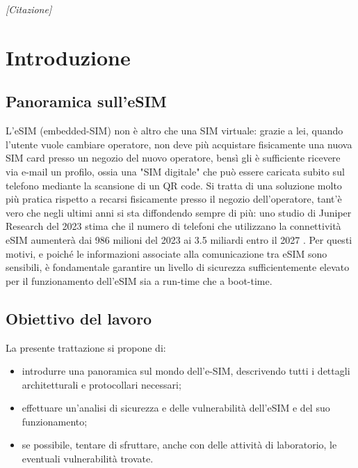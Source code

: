 \documentclass[10pt, oneside]{book}
\begin{document}
\begin{frontespizio}
\end{frontespizio}

\begin{flushright}
\null{}
\textit{[Citazione]}
\null
\end{flushright}

\tableofcontents
\listoffigures
\listoftables

\chapter{Introduzione}
\section{Panoramica sull'eSIM}
L'eSIM (embedded-SIM) non è altro che una SIM virtuale: grazie a lei, quando l'utente vuole cambiare operatore, non deve più acquistare fisicamente una nuova SIM card presso un negozio del nuovo operatore, bensì gli è sufficiente ricevere via e-mail un profilo, ossia una "SIM digitale" che può essere caricata subito sul telefono mediante la scansione di un QR code. Si tratta di una soluzione molto più pratica rispetto a recarsi fisicamente presso il negozio dell'operatore, tant'è vero che negli ultimi anni si sta diffondendo sempre di più: uno studio di Juniper Research del 2023 stima che il numero di telefoni che utilizzano la connettività eSIM aumenterà dai 986 milioni del 2023 ai 3.5 miliardi entro il 2027 \cite{Corcom}. Per questi motivi, e poiché le informazioni associate alla comunicazione tra eSIM sono sensibili, è fondamentale garantire un livello di sicurezza sufficientemente elevato per il funzionamento dell'eSIM sia a run-time che a boot-time.

\section{Obiettivo del lavoro}
La presente trattazione si propone di:
\begin{itemize}
\item introdurre una panoramica sul mondo dell'e-SIM, descrivendo tutti i dettagli architetturali e protocollari necessari;
\item effettuare un'analisi di sicurezza e delle vulnerabilità dell'eSIM e del suo funzionamento;
\item se possibile, tentare di sfruttare, anche con delle attività di laboratorio, le eventuali vulnerabilità trovate.
\end{itemize}
\end{document}
